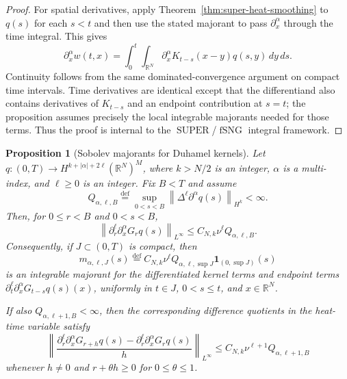 \documentclass{amsart}
\newtheorem{prop}{Proposition}
\DeclareMathOperator{\SUPER}{SUPER}
\DeclareMathOperator{\fSNG}{fSNG}
\newcommand{\eqdef}{\overset{\mathrm{def}}{=}}
\newcommand{\norm}[1]{\left\lVert #1\right\rVert}
\newcommand{\abs}[1]{\left\lvert #1\right\rvert}
\begin{document}
\begin{proof}
For spatial derivatives, apply Theorem~\ref{thm:super-heat-smoothing} to
$q(s)$ for each $s<t$ and then use the stated majorant to pass
$\partial_x^\alpha$ through the time integral.  This gives
\[
  \partial_x^\alpha w(t,x)
  =
  \int_0^t\int_{\mathbb{R}^N}
  \partial_x^\alpha K_{t-s}(x-y)q(s,y)\,dy\,ds .
\]
Continuity follows from the same dominated-convergence argument on compact
time intervals.  Time derivatives are identical except that the differentiand
also contains derivatives of $K_{t-s}$ and an endpoint contribution at
$s=t$; the proposition assumes precisely the local integrable majorants needed
for those terms.  Thus the proof is internal to the $\SUPER$/$\fSNG$
integral framework.
\end{proof}

\begin{prop}[Sobolev majorants for Duhamel kernels]
\label{prop:sobolev-duhamel-majorants}
Let $q:(0,T)\to H^{k+\abs{\alpha}+2\ell}(\mathbb{R}^N)^M$, where
$k>N/2$ is an integer, $\alpha$ is a multi-index, and $\ell\geq0$ is an
integer.  Fix $B<T$ and assume
\[
  Q_{\alpha,\ell,B}
  \eqdef
  \sup_{0<s<B}
  \norm{\Delta^\ell\partial^\alpha q(s)}_{H^k}
  <\infty .
\]
Then, for $0\leq r<B$ and $0<s<B$,
\[
  \norm{\partial_r^\ell\partial_x^\alpha G_rq(s)}_{L^\infty}
  \leq C_{N,k}\nu^\ell Q_{\alpha,\ell,B}.
\]
Consequently, if $J\subset(0,T)$ is compact, then
\[
  m_{\alpha,\ell,J}(s)
  \eqdef
  C_{N,k}\nu^\ell Q_{\alpha,\ell,\sup J}\mathbf 1_{(0,\sup J)}(s)
\]
is an integrable majorant for the differentiated kernel terms and endpoint
terms
$\partial_t^\ell\partial_x^\alpha G_{t-s}q(s)(x)$, uniformly in
$t\in J$, $0<s\leq t$, and $x\in\mathbb{R}^N$.

If also $Q_{\alpha,\ell+1,B}<\infty$, then the corresponding difference
quotients in the heat-time variable satisfy
\[
  \norm{
  \frac{\partial_r^\ell\partial_x^\alpha G_{r+h}q(s)
        -\partial_r^\ell\partial_x^\alpha G_rq(s)}{h}
  }_{L^\infty}
  \leq
  C_{N,k}\nu^{\ell+1}Q_{\alpha,\ell+1,B}
\]
whenever $h\neq0$ and $r+\theta h\geq0$ for $0\leq\theta\leq1$.
\end{prop}
\end{document}
